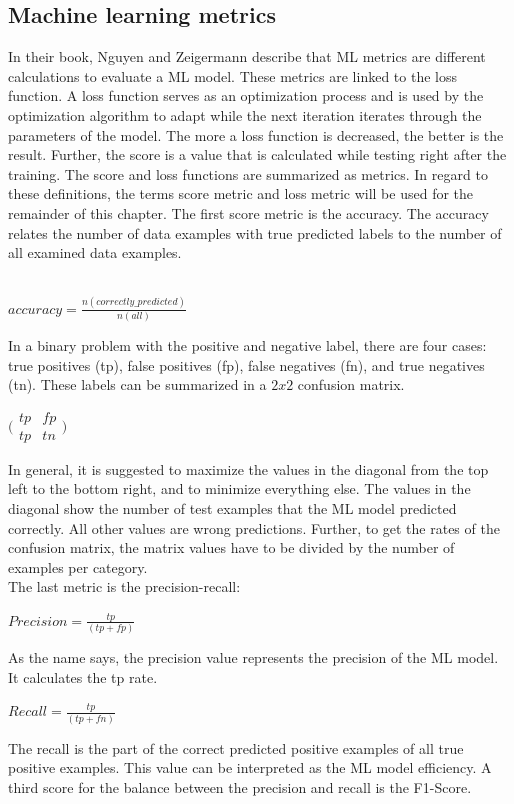 \subsection{Machine learning metrics}
\label{sec:ml_metrics}

In their book, Nguyen and Zeigermann \cite{9783960101925} describe that ML metrics are different calculations to evaluate a ML model. These metrics are linked to the loss function. A loss function serves as an optimization process and is used by the optimization algorithm to adapt while the next iteration iterates through the parameters of the model. The more a loss function is decreased, the better is the result. Further, the score is a value that is calculated while testing right after the training. The score and loss functions are summarized as metrics. In regard to these definitions, the terms score metric and loss metric will be used for the remainder of this chapter. The first score metric is the accuracy. The accuracy relates the number of data examples with true predicted labels to the number of all examined data examples. \\ \\
\begin{center}
  $accuracy=\frac{n(correctly\_predicted)}{n(all)}$
\end{center}
In a binary problem with the positive and negative label, there are four cases: true positives (tp), false positives (fp), false negatives (fn), and true negatives (tn). These labels can be summarized in a $2 x 2$ confusion matrix. \\
\begin{center}
  $\bigl( \begin{matrix}tp & fp\\ tp & tn\end{matrix}\bigr)$
\end{center}
In general, it is suggested to maximize the values in the diagonal from the top left to the bottom right, and to minimize everything else. The values in the diagonal show the number of test examples that the ML model predicted correctly. All other values are wrong predictions. Further, to get the rates of the confusion matrix, the matrix values have to be divided by the number of examples per category. \\ The last metric is the precision-recall:
\begin{center}
  $Precision = \frac{tp}{(tp + fp)}$
\end{center}
As the name says, the precision value represents the precision of the ML model. It calculates the tp rate.
\begin{center}
  $Recall = \frac{tp}{(tp + fn)}$
\end{center}
The recall is the part of the correct predicted positive examples of all true positive examples. This value can be interpreted as the ML model efficiency.
A third score for the balance between the precision and recall is the F1-Score.

